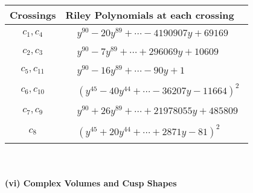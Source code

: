 \documentclass[1p]{elsarticle_modified}
\theoremstyle{definition}
\begin{document}
\begin{tabular}{m{50pt}|m{274pt}}
Crossings & \hspace{64pt}Riley Polynomials at each crossing \\
\hline $$\begin{aligned}c_{1},c_{4}\end{aligned}$$&$\begin{aligned}
&y^{90}-20 y^{89}+\cdots-4190907 y+69169
\end{aligned}$\\
\hline $$\begin{aligned}c_{2},c_{3}\end{aligned}$$&$\begin{aligned}
&y^{90}-7 y^{89}+\cdots+296069 y+10609
\end{aligned}$\\
\hline $$\begin{aligned}c_{5},c_{11}\end{aligned}$$&$\begin{aligned}
&y^{90}-16 y^{89}+\cdots-90 y+1
\end{aligned}$\\
\hline $$\begin{aligned}c_{6},c_{10}\end{aligned}$$&$\begin{aligned}
&(y^{45}-40 y^{44}+\cdots-36207 y-11664)^{2}
\end{aligned}$\\
\hline $$\begin{aligned}c_{7},c_{9}\end{aligned}$$&$\begin{aligned}
&y^{90}+26 y^{89}+\cdots+21978055 y+485809
\end{aligned}$\\
\hline $$\begin{aligned}c_{8}\end{aligned}$$&$\begin{aligned}
&(y^{45}+20 y^{44}+\cdots+2871 y-81)^{2}
\end{aligned}$\\
\hline
\end{tabular}\\~\\
\newpage\flushleft \textbf{(vi) Complex Volumes and Cusp Shapes}
\end{document}
